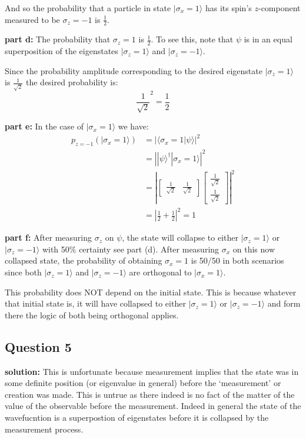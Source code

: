 \documentclass{article}
\begin{document}
And so the probability that a particle in state $|\sigma_x=1\rangle$ has its spin's $z$-component measured to be $\sigma_z=-1$ is $\frac{1}{2}$.
\bigskip

\noindent\textbf{part d:} The probability that $\sigma_z=1$ is $\frac{1}{2}$. To see this, note that $\psi$ is in an equal superposition of the eigenstates $|\sigma_z=1\rangle$ and $|\sigma_z=-1\rangle$.

Since the probability amplitude corresponding to the desired eigenstate $|\sigma_z=1\rangle$ is $\frac{1}{\sqrt{2}}$ the desired probability is: 
$$\frac{1}{\sqrt{2}}^2=\frac{1}{2}$$
\bigskip

\noindent\textbf{part e:} In the case of $|\sigma_x=1\rangle$ we have:
\begin{align*}
    p_{z=-1}(|\sigma_x=1\rangle)&=\left|\langle\sigma_x=1|\psi\rangle\right|^2\\
    &=\left||\psi\rangle^\dagger|\sigma_x=1\rangle\right|^2\\
    &=\left|\begin{bmatrix}
        \frac{1}{\sqrt{2}}&\frac{1}{\sqrt{2}}
    \end{bmatrix}\begin{bmatrix}
        \frac{1}{\sqrt{2}}\\\frac{1}{\sqrt{2}}
    \end{bmatrix}\right|^2\\
    &=\left|\frac{1}{2}+\frac{1}{2}\right|^2=1
\end{align*}
\bigskip

\noindent\textbf{part f:} After measuring $\sigma_z$ on $\psi$, the state will collapse to either $|\sigma_z=1\rangle$ or $|\sigma_z=-1\rangle$ with 50\% certainty see part (d). After measuring $\sigma_x$ on this now collapsed state, the probability of obtaining $\sigma_x=1$ is 50/50 in both scenarios since both $|\sigma_z=1\rangle$ and $|\sigma_z=-1\rangle$ are orthogonal to $|\sigma_x=1\rangle$.

This probability does NOT depend on the initial state. This is because whatever that initial state is, it will have collapsed to either $|\sigma_z=1\rangle$ or $|\sigma_z=-1\rangle$ and form there the logic of both being orthogonal applies.

\subsection*{Question 5}
\noindent\textbf{solution:} This is unfortunate because measurement implies that the state was in some definite position (or eigenvalue in general) before the `measurement' or creation was made. This is untrue as there indeed is no fact of the matter of the value of the observable before the measurement. Indeed in general the state of the wavefucntion is a superpostion of eigenstates before it is collapsed by the measurement process.
\end{document}
